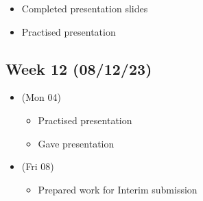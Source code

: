 \begin{itemize}
        \begin{itemize}
          \tightlist
          \item
                Completed presentation slides
          \item
                Practised presentation
        \end{itemize}
\end{itemize}

\hypertarget{week-12-081223}{%
  \subsection{Week 12 (08/12/23)}\label{week-12-081223}}

\begin{itemize}
  \tightlist
  \item
        (Mon 04)

        \begin{itemize}
          \tightlist
          \item
                Practised presentation
          \item
                Gave presentation
        \end{itemize}
  \item
        (Fri 08)

        \begin{itemize}
          \tightlist
          \item
                Prepared work for Interim submission
        \end{itemize}
\end{itemize}

